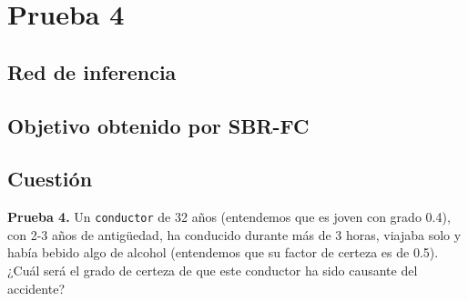 

\section{Prueba 4}

\subsection{Red de inferencia}


\subsection{Objetivo obtenido por SBR-FC}

\subsection{Cuestión}
\begin{ejer}
	\textbf{Prueba 4.} Un \texttt{conductor} de 32 años (entendemos que es joven con grado 0.4), 
	con 2-3 años de antigüedad, ha conducido durante más de 3 horas, viajaba solo y 
	había bebido algo de alcohol (entendemos que su factor de certeza es de 0.5). \\
	¿Cuál será el grado de certeza de que este conductor ha sido causante del accidente?
\end{ejer}